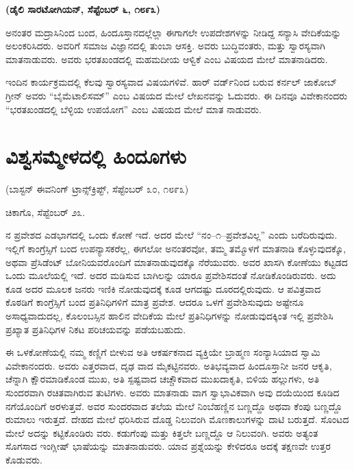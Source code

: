 \delimiter

\begin{center}
\textbf{(ಡೈಲಿ ಸಾರಟೋಗಿಯನ್​, ಸೆಪ್ಟೆಂಬರ್​ ೬, ೧೮೯೩)}
\end{center}

ಅನಂತರ ಮದ್ರಾಸಿನಿಂದ ಬಂದ, ಹಿಂದೂಸ್ತಾನದಲ್ಲೆಲ್ಲಾ ಈಗಾಗಲೇ ಉಪದೇಶಗಳನ್ನು ನೀಡಿದ್ದ ಸನ್ಯಾಸಿ ವೇದಿಕೆಯನ್ನು ಅಲಂಕರಿಸಿದರು. ಅವರಿಗೆ ಸಮಾಜ ವಿಜ್ಞಾನದಲ್ಲಿ ತುಂಬಾ ಆಸಕ್ತಿ. ಅವರು ಬುದ್ಧಿವಂತರು, ಮತ್ತು ಸ್ವಾರಸ್ಯವಾಗಿ ಮಾತನಾಡುವರು. ಅವರು ಭರತಖಂಡದಲ್ಲಿ ಮಹಮದೀಯ ಆಳ್ವಿಕೆ ಎಂಬ ವಿಷಯದ ಮೇಲೆ ಮಾತನಾಡಿದರು.

ಇಂದಿನ ಕಾರ್ಯಕ್ರಮದಲ್ಲಿ ಕೆಲವು ಸ್ವಾರಸ್ಯವಾದ ವಿಷಯಗಳಿವೆ. ಹಾರ್​ ವರ್ಡ್​ನಿಂದ ಬರುವ ಕರ್ನಲ್​ ಜಾಕೋಬ್​ ಗ್ರೀನ್​ ಅವರು “ಬೈಮೆಟಾಲಿಸಮ್​” ಎಂಬ ವಿಷಯದ ಮೇಲೆ ಲೇಖನವನ್ನು ಓದುವರು. ಈ ದಿನವೂ ವಿವೇಕಾನಂದರು “ಭರತಖಂಡದಲ್ಲಿ ಬೆಳ್ಳಿಯ ಉಪಯೋಗ” ಎಂಬ ವಿಷಯದ ಮೇಲೆ ಮಾತ ನಾಡುವರು.

\delimiter

\section{ವಿಶ್ವಸಮ್ಮೇಳದಲ್ಲಿ ಹಿಂದೂಗಳು}

\begin{center}
(ಬಾಸ್ಟನ್​ ಈವನಿಂಗ್​ ಟ್ರಾನ್ಸ್​ಕ್ರಿಪ್ಟ್​, ಸೆಪ್ಟೆಂಬರ್​ ೩೦, ೧೮೯೩)
\end{center}

ಚಿಕಾಗೊ, ಸೆಪ್ಟೆಂಬರ್​ ೨೩.

 ನ ಪ್ರವೇಶದ ಎಡಭಾಗದಲ್ಲಿ ಒಂದು ಕೋಣೆ ಇದೆ. ಅದರ ಮೇಲೆ “ನಂ–೧–ಪ್ರವೇಶವಿಲ್ಲ” ಎಂದು ಬರೆದಿರುವುದು. ಇಲ್ಲಿಗೆ ಕಾಂಗ್ರೆಸ್ಸಿಗೆ ಬಂದ ಉಪನ್ಯಾಸಕರೆಲ್ಲ, ಈಗಲೋ ಅನಂತರವೋ, ತಮ್ಮ ತಮ್ಮೊಳಗೆ ಮಾತನಾಡಿ ಕೊಳ್ಳುವುದಕ್ಕೊ, ಅಥವಾ ಪ್ರೆಸಿಡೆಂಟ್​ ಬೋನಿಯವರೊಂದಿಗೆ ಮಾತನಾಡುವುದಕ್ಕೊ ನೆರೆಯುವರು. ಅವರ ಖಾಸಗಿ ಕೋಣೆಯು ಕಟ್ಟಡದ ಒಂದು ಮೂಲೆಯಲ್ಲಿ ಇದೆ. ಅದರ ಮಡಿಸುವ ಬಾಗಿಲನ್ನು ಯಾರೂ ಪ್ರವೇಶಿಸದಂತೆ ನೋಡಿಕೊಂಡಿರುವರು. ಅದು ಕೂಡ ಅದರ ಮೂಲಕ ಜನರು ಇಣಿಕಿ ನೋಡುವುದಕ್ಕೆ ಕೂಡ ಆಗದಷ್ಟು ದೂರದಲ್ಲಿರುವುದು. ಆ ಪವಿತ್ರವಾದ ಕೊಠಡಿಗೆ ಕಾಂಗ್ರೆಸ್ಸಿಗೆ ಬಂದ ಪ್ರತಿನಿಧಿಗಳಿಗೆ ಮಾತ್ರ ಪ್ರವೇಶ. ಆದರೂ ಒಳಗೆ ಪ್ರವೇಶಿಸುವುದು ಅಷ್ಟೇನೂ ಅಸಾಧ್ಯವಾದುದಲ್ಲ, ಕೊಲಂಬಸ್ಸಿನ ಹಾಲಿನ ವೇದಿಕೆಯ ಮೇಲೆ ಪ್ರತಿನಿಧಿಗಳನ್ನು ನೋಡುವುದಕ್ಕಿಂತ ಇಲ್ಲಿ ಪ್ರವೇಶಿಸಿ ಪ್ರಖ್ಯಾತ ಪ್ರತಿನಿಧಿಗಳ ನಿಕಟ ಪರಿಚಯವನ್ನು ಪಡೆಯಬಹುದು.

ಈ ಒಳಕೋಣೆಯಲ್ಲಿ ನಮ್ಮ ಕಣ್ಣಿಗೆ ಬೀಳುವ ಅತಿ ಆಕರ್ಷಕನಾದ ವ್ಯಕ್ತಿಯೇ ಬ್ರಾಹ್ಮಣ ಸಂನ್ಯಾಸಿಯಾದ ಸ್ವಾಮಿ ವಿವೇಕಾನಂದರು. ಅವರು ಎತ್ತರವಾದ, ದೃಢ ವಾದ ಮೈಕಟ್ಟಿನವರು. ಅತಿಭವ್ಯವಾದ ಹಿಂದೂಸ್ತಾನೀ ಜನರ ಆಕೃತಿ, ಚೆನ್ನಾಗಿ ಕ್ಷೌರಮಾಡಿಕೊಂಡ ಮುಖ, ಅತಿ ಸ್ಪಷ್ಟವಾದ ಚಚ್ಚೌಕವಾದ ಮುಖದಾಕೃತಿ, ಬಿಳಿಯ ಹಲ್ಲುಗಳು, ಅತಿ ಸುಂದರವಾಗಿ ರಚಿತವಾಗಿರುವ ತುಟಿಗಳು. ಅವರು ಮಾತನಾಡು ವಾಗ ಸ್ವಾಭಾವಿಕವಾಗಿ ಅವು ದಯೆಯಿಂದ ಕೂಡಿದ ನಗೆಯೊಂದಿಗೆ ಅರಳುತ್ತವೆ. ಅವರ ಸುಂದರವಾದ ತಲೆಯ ಮೇಲೆ ನಿಂಬೆಹಣ್ಣಿನ ಬಣ್ಣದ್ದೊ ಅಥವಾ ಕೆಂಪು ಬಣ್ಣದ್ದೊ ರುಮಾಲು ಇರುತ್ತದೆ. ದೇಹದ ಮೇಲೆ ಧರಿಸಿರುವ ದೊಡ್ಡ ನಿಲುವಂಗಿ ಮೊಣಕಾಲುಗಳನ್ನು ದಾಟಿ ಬರುತ್ತದೆ. ಸೊಂಟದ ಮೇಲೆ ಅದನ್ನು ಕಟ್ಟಿಕೊಂಡಿರು ವರು. ಕಡುಗೆಂಪು ಮತ್ತು ಕಿತ್ತಲೇ ಬಣ್ಣದ್ದೊ ಆ ನಿಲುವಂಗಿ. ಅವರು ಅತ್ಯಂತ ಸೊಗಸಾದ ಇಂಗ್ಲೀಷ್​ ಭಾಷೆಯನ್ನು ಮಾತನಾಡುವರು. ಯಾವ ಪ್ರಶ್ನೆಯನ್ನು ಕೇಳಿದರೂ ಅದಕ್ಕೆ ತಕ್ಷಣವೇ ಉತ್ತರ ಕೊಡುವರು.

